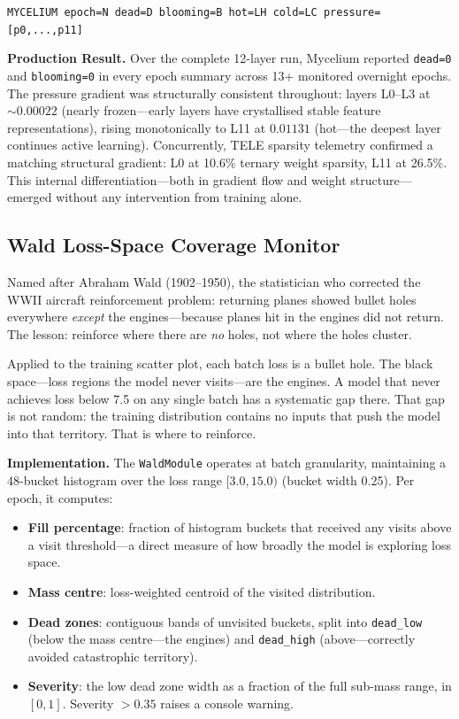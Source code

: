 \documentclass[journal,10pt,twocolumn]{IEEEtran}
\begin{document}
{\small\texttt{MYCELIUM epoch=N dead=D blooming=B hot=LH cold=LC pressure=[p0,...,p11]}}

\textbf{Production Result.}
Over the complete 12-layer run, Mycelium reported \texttt{dead=0} and
\texttt{blooming=0} in every epoch summary across 13+ monitored overnight epochs.
The pressure gradient was structurally consistent throughout: layers L0--L3 at
${\sim}0.00022$ (nearly frozen---early layers have crystallised stable feature
representations), rising monotonically to L11 at $0.01131$ (hot---the deepest
layer continues active learning). Concurrently, TELE sparsity telemetry confirmed
a matching structural gradient: L0 at 10.6\% ternary weight sparsity, L11 at
26.5\%. This internal differentiation---both in gradient flow and weight
structure---emerged without any intervention from training alone.

\subsection{Wald Loss-Space Coverage Monitor}
\label{subsec:wald}

Named after Abraham Wald (1902--1950), the statistician who corrected the
WWII aircraft reinforcement problem: returning planes showed bullet holes
everywhere \emph{except} the engines---because planes hit in the engines did
not return. The lesson: reinforce where there are \emph{no} holes, not where
the holes cluster.

Applied to the training scatter plot, each batch loss is a bullet hole. The
black space---loss regions the model never visits---are the engines. A model
that never achieves loss below 7.5 on any single batch has a systematic gap
there. That gap is not random: the training distribution contains no inputs
that push the model into that territory. That is where to reinforce.

\textbf{Implementation.} The \texttt{WaldModule} operates at batch granularity,
maintaining a 48-bucket histogram over the loss range $[3.0, 15.0)$ (bucket
width 0.25). Per epoch, it computes:

\begin{itemize}
  \item \textbf{Fill percentage}: fraction of histogram buckets that received
        any visits above a visit threshold---a direct measure of how broadly
        the model is exploring loss space.
  \item \textbf{Mass centre}: loss-weighted centroid of the visited distribution.
  \item \textbf{Dead zones}: contiguous bands of unvisited buckets, split into
        \texttt{dead\_low} (below the mass centre---the engines) and
        \texttt{dead\_high} (above---correctly avoided catastrophic territory).
  \item \textbf{Severity}: the low dead zone width as a fraction of the full
        sub-mass range, in $[0,1]$. Severity $>0.35$ raises a console warning.
\end{itemize}
\end{document}
